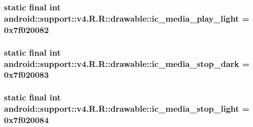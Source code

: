 \hypertarget{classandroid_1_1support_1_1v4_1_1_r_1_1drawable_4231b9099ac8f747b64ea591c2b6b66e}{
\subsubsection[{ic\_\-media\_\-play\_\-light}]{\setlength{\rightskip}{0pt plus 5cm}static final int android::support::v4.R.R::drawable::ic\_\-media\_\-play\_\-light = 0x7f020082}}
\label{classandroid_1_1support_1_1v4_1_1_r_1_1drawable_4231b9099ac8f747b64ea591c2b6b66e}


\hypertarget{classandroid_1_1support_1_1v4_1_1_r_1_1drawable_fcf9b9a20997fa2853aa3c95f4c56cfa}{
\subsubsection[{ic\_\-media\_\-stop\_\-dark}]{\setlength{\rightskip}{0pt plus 5cm}static final int android::support::v4.R.R::drawable::ic\_\-media\_\-stop\_\-dark = 0x7f020083}}
\label{classandroid_1_1support_1_1v4_1_1_r_1_1drawable_fcf9b9a20997fa2853aa3c95f4c56cfa}


\hypertarget{classandroid_1_1support_1_1v4_1_1_r_1_1drawable_233fa61d2bdd4cdb0271347e67681743}{
\subsubsection[{ic\_\-media\_\-stop\_\-light}]{\setlength{\rightskip}{0pt plus 5cm}static final int android::support::v4.R.R::drawable::ic\_\-media\_\-stop\_\-light = 0x7f020084}}
\label{classandroid_1_1support_1_1v4_1_1_r_1_1drawable_233fa61d2bdd4cdb0271347e67681743}


